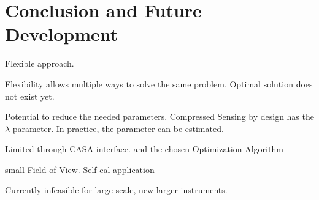 \section{Conclusion and Future Development}
Flexible approach.

Flexibility allows multiple ways to solve the same problem. Optimal solution does not exist yet. 

Potential to reduce the needed parameters. Compressed Sensing by design has the $\lambda$ parameter. In practice, the parameter can be estimated.

Limited through CASA interface. and the chosen Optimization Algorithm

small Field of View. Self-cal application

Currently infeasible for large scale, new larger instruments.

